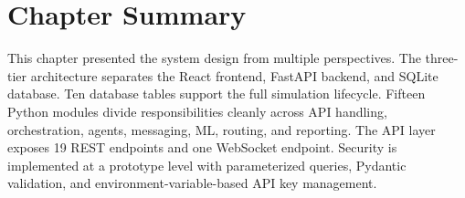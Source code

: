 \section{Chapter Summary}
\label{sec:ch5_summary}

This chapter presented the system design from multiple perspectives. The three-tier architecture separates the React frontend, FastAPI backend, and SQLite database. Ten database tables support the full simulation lifecycle. Fifteen Python modules divide responsibilities cleanly across API handling, orchestration, agents, messaging, ML, routing, and reporting. The API layer exposes 19 REST endpoints and one WebSocket endpoint. Security is implemented at a prototype level with parameterized queries, Pydantic validation, and environment-variable-based API key management.
